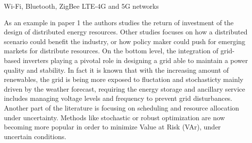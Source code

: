 Wi-Fi, Bluetooth, ZigBee \cite{karunarathne2018wireless} LTE-4G and 5G networks \cite{li20185g}



As an example in paper 1 the authors studies the return of investment of the design
of distributed energy resources. Other studies focuses on how a distributed scenario could benefit the industry, 
or how policy maker could push for emerging markets for distribute resources. On the bottom level, the integration of grid-based inverters
playing a pivotal role in designing a grid able to maintain a power quality and stability.
In fact it is known that with the increasing amount of renewables, the grid is being more exposed to fluctation 
and stochasticty mainly driven by the weather forecast, requiring the energy storage and ancillary service includes 
managing voltage levels and frequency to prevent grid disturbances.
Another part of the literature is focusing on scheduling and resource allocation under uncertainty. 
Methods like stochastic or robust optimization are now becoming more popular in order to minimize Value at Risk (VAr), under uncertain conditions. 





